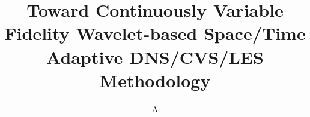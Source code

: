 \documentclass[defaultstyle,11pt]{thesis2side}
\title{Toward Continuously Variable Fidelity Wavelet-based Space/Time Adaptive DNS/CVS/LES Methodology}
\author{A}{Nejadmalayeri}
\begin{document}




\nocite{*}		%





\end{document}

